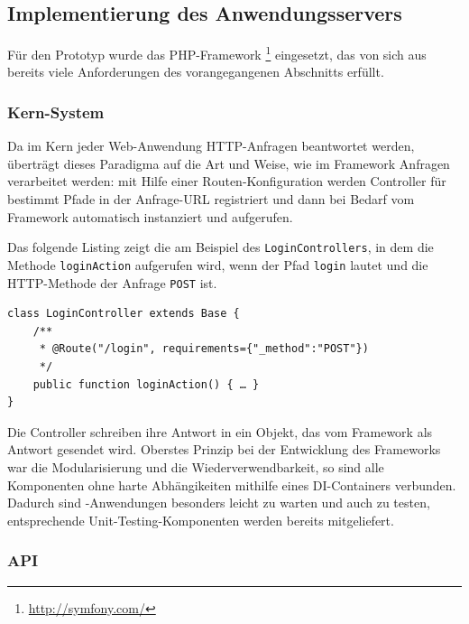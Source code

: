 \pagebreak

\subsection{Implementierung des Anwendungsservers}\label{l:implementierung-server}

Für den Prototyp wurde das PHP-Framework \footnote{\url{http://symfony.com/}} eingesetzt, das von sich aus bereits viele Anforderungen des vorangegangenen Abschnitts erfüllt. 

\subsubsection{Kern-System}

Da im Kern jeder Web-Anwendung HTTP-Anfragen beantwortet werden, überträgt  dieses Paradigma auf die Art und Weise, wie im Framework Anfragen verarbeitet werden: mit Hilfe einer Routen-Konfiguration werden Controller für bestimmt Pfade in der Anfrage-URL registriert und dann bei Bedarf vom Framework automatisch instanziert und aufgerufen. 

Das folgende Listing zeigt die am Beispiel des \texttt{LoginControllers}, in dem die Methode \texttt{loginAction} aufgerufen wird, wenn der Pfad \texttt{\/login} lautet und die HTTP-Methode der Anfrage \texttt{POST} ist.

\begin{samepage}
\begin{verbatim}
class LoginController extends Base {
    /**
     * @Route("/login", requirements={"_method":"POST"})
     */
    public function loginAction() { … }
}
\end{verbatim}
\end{samepage}

Die Controller schreiben ihre Antwort in ein Objekt, das vom Framework als Antwort gesendet wird. Oberstes Prinzip bei der Entwicklung des Frameworks war die Modularisierung und die Wiederverwendbarkeit, so sind alle Komponenten ohne harte Abhängikeiten mithilfe eines DI-Containers verbunden. Dadurch sind -Anwendungen besonders leicht zu warten und auch zu testen, entsprechende Unit-Testing-Komponenten werden bereits mitgeliefert.

\subsubsection{API}\label{l:api-implementierung}

